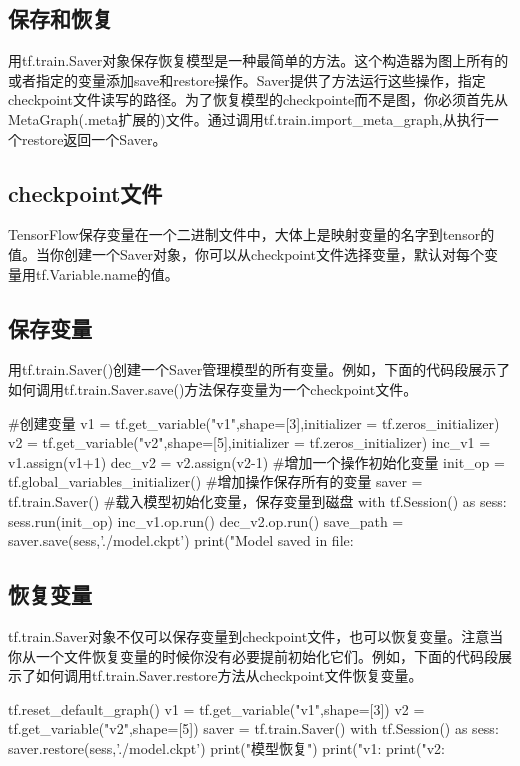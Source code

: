 \subsection{保存和恢复}
用tf.train.Saver对象保存恢复模型是一种最简单的方法。这个构造器为图上所有的或者指定的变量添加save和restore操作。Saver提供了方法运行这些操作，指定checkpoint文件读写的路径。为了恢复模型的checkpointe而不是图，你必须首先从MetaGraph(.meta扩展的)文件。通过调用tf.train.import\_meta\_graph,从执行一个restore返回一个Saver。
\subsection{checkpoint文件}
TensorFlow保存变量在一个二进制文件中，大体上是映射变量的名字到tensor的值。当你创建一个Saver对象，你可以从checkpoint文件选择变量，默认对每个变量用tf.Variable.name的值。
\subsection{保存变量}
用tf.train.Saver()创建一个Saver管理模型的所有变量。例如，下面的代码段展示了如何调用tf.train.Saver.save()方法保存变量为一个checkpoint文件。
\begin{python}
#创建变量
v1 = tf.get_variable("v1",shape=[3],initializer = tf.zeros_initializer)
v2 = tf.get_variable("v2",shape=[5],initializer = tf.zeros_initializer)
inc_v1 = v1.assign(v1+1)
dec_v2 = v2.assign(v2-1)
#增加一个操作初始化变量
init_op = tf.global_variables_initializer()
#增加操作保存所有的变量
saver = tf.train.Saver()
#载入模型初始化变量，保存变量到磁盘
with tf.Session() as sess:
    sess.run(init_op)
    inc_v1.op.run()
    dec_v2.op.run()
    save_path = saver.save(sess,'./model.ckpt')
    print("Model saved in file:%
\end{python}
\subsection{恢复变量}
tf.train.Saver对象不仅可以保存变量到checkpoint文件，也可以恢复变量。注意当你从一个文件恢复变量的时候你没有必要提前初始化它们。例如，下面的代码段展示了如何调用tf.train.Saver.restore方法从checkpoint文件恢复变量。
\begin{python}
tf.reset_default_graph()
v1 = tf.get_variable("v1",shape=[3])
v2 = tf.get_variable("v2",shape=[5])
saver = tf.train.Saver()
with tf.Session() as sess:
    saver.restore(sess,'./model.ckpt')
    print("模型恢复")
    print("v1:%
    print("v2:%
\end{python}
